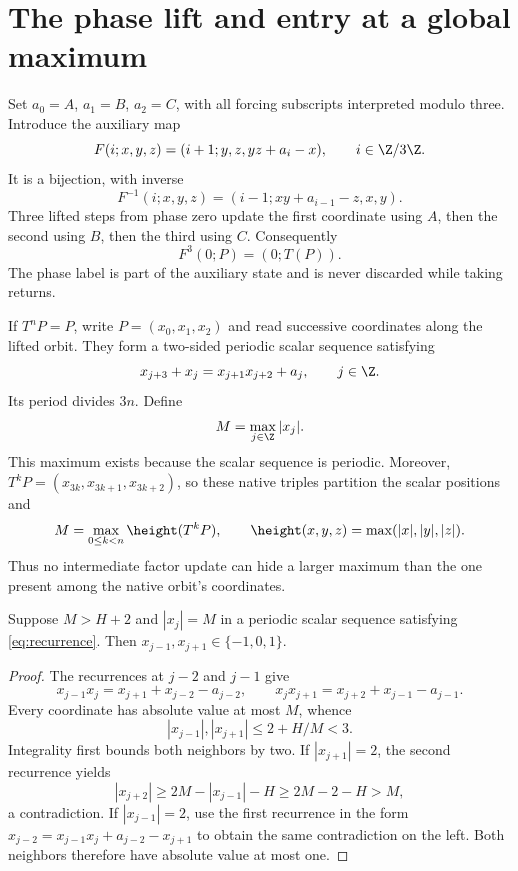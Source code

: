 \section{The phase lift and entry at a global maximum}\label{sec:phase}

Set \(a_0=A\), \(a_1=B\), \(a_2=C\), with all forcing subscripts
interpreted modulo three. Introduce the auxiliary map
\begin{equation}\label{eq:lift}
 F(i;x,y,z)=(i+1;y,z,yz+a_i-x),
 \qquad i\in\Z/3\Z.
\end{equation}
It is a bijection, with inverse
\begin{equation}\label{eq:lift_inverse}
 F^{-1}(i;x,y,z)=(i-1;xy+a_{i-1}-z,x,y).
\end{equation}
Three lifted steps from phase zero update the first coordinate using
\(A\), then the second using \(B\), then the third using \(C\).
Consequently
\begin{equation}\label{eq:clock}
 F^3(0;P)=(0;T(P)).
\end{equation}
The phase label is part of the auxiliary state and is never discarded
while taking returns.

If \(T^nP=P\), write \(P=(x_0,x_1,x_2)\) and read successive
coordinates along the lifted orbit. They form a two-sided periodic
scalar sequence satisfying
\begin{equation}\label{eq:recurrence}
 x_{j+3}+x_j=x_{j+1}x_{j+2}+a_j,\qquad j\in\Z.
\end{equation}
Its period divides \(3n\). Define
\begin{equation}\label{eq:global_max}
 M=\max_{j\in\Z}|x_j|.
\end{equation}
This maximum exists because the scalar sequence is periodic. Moreover,
\(T^kP=(x_{3k},x_{3k+1},x_{3k+2})\), so these native triples partition
the scalar positions and
\begin{equation}\label{eq:max_native}
 M=\max_{0\le k<n}\height(T^kP),\qquad
 \height(x,y,z)=\max(|x|,|y|,|z|).
\end{equation}
Thus no intermediate factor update can hide a larger maximum than the
one present among the native orbit's coordinates.

\begin{lemma}\label{lem:entry}
Suppose \(M>H+2\) and \(|x_j|=M\) in a periodic scalar sequence
satisfying \eqref{eq:recurrence}. Then
\(x_{j-1},x_{j+1}\in\{-1,0,1\}\).
\end{lemma}

\begin{proof}
The recurrences at \(j-2\) and \(j-1\) give
\[
 x_{j-1}x_j=x_{j+1}+x_{j-2}-a_{j-2},\qquad
 x_jx_{j+1}=x_{j+2}+x_{j-1}-a_{j-1}.
\]
Every coordinate has absolute value at most \(M\), whence
\[
 |x_{j-1}|,|x_{j+1}|\le 2+H/M<3.
\]
Integrality first bounds both neighbors by two. If
\(|x_{j+1}|=2\), the second recurrence yields
\[
 |x_{j+2}|\ge2M-|x_{j-1}|-H
             \ge2M-2-H>M,
\]
a contradiction. If \(|x_{j-1}|=2\), use the first recurrence in the
form \(x_{j-2}=x_{j-1}x_j+a_{j-2}-x_{j+1}\) to obtain the same
contradiction on the left. Both neighbors therefore have absolute
value at most one.
\end{proof}

